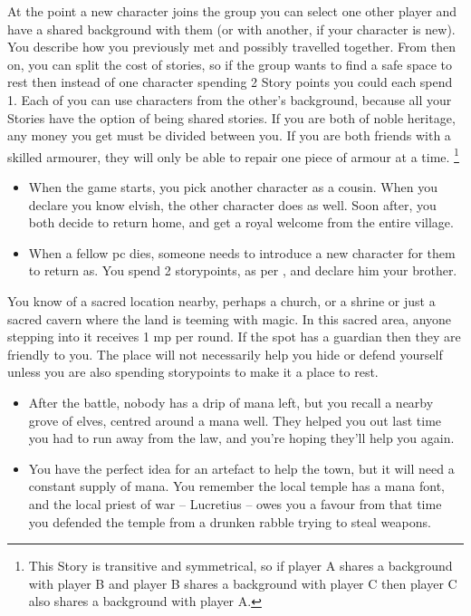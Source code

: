 \begin{multicols}{2}
\label{sharedstories}%
At the point a new character joins the group you can select one other player and have a shared background with them (or with another, if your character is new).
You describe how you previously met and possibly travelled together.
From then on, you can split the cost of stories, so if the group wants to find a safe space to rest then instead of one character spending 2 Story points you could each spend 1.
Each of you can use characters from the other's background, because all your Stories have the option of being shared stories.
If you are both of noble heritage, any money you get must be divided between you.
If you are both friends with a skilled armourer, they will only be able to repair one piece of armour at a time.%
\footnote{This Story is transitive and symmetrical, so if player A shares a background with player B and player B shares a background with player C then player C also shares a background with player A.}

\begin{itemize}
\item
When the game starts, you pick another character as a cousin.
When you declare you know elvish, the other character does as well.
Soon after, you both decide to return home, and get a royal welcome from the entire village.
\item
When a fellow \gls{pc} dies, someone needs to introduce a new character for them to return as.
You spend 2 \glspl{storypoint}, as per , and declare him your brother.
\end{itemize}

You know of a sacred location nearby, perhaps a church, or a shrine or just a sacred cavern where the land is teeming with magic.
In this sacred area, anyone stepping into it receives 1 \gls{mp} per round.
If the spot has a guardian then they are friendly to you.
The place will not necessarily help you hide or defend yourself unless you are also spending \glspl{storypoint} to make it a place to rest.

\begin{itemize}
\item After the battle, nobody has a drip of mana left, but you recall a nearby grove of elves, centred around a mana well.
They helped you out last time you had to run away from the law, and you're hoping they'll help you again.
\item You have the perfect idea for an artefact to help the town, but it will need a constant supply of mana.
You remember the local temple has a mana font, and the local priest of war -- Lucretius -- owes you a favour from that time you defended the temple from a drunken rabble trying to steal weapons.
\end{itemize}


\end{multicols}
